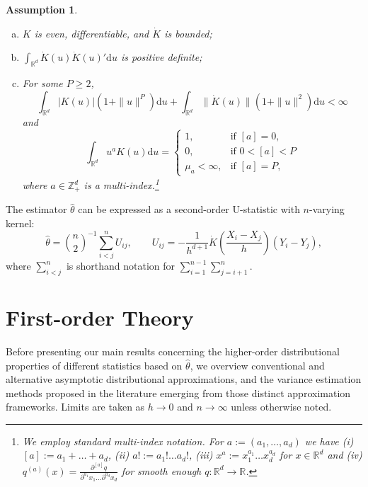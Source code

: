 \documentclass[11pt]{article}
\newtheorem{assumption}{Assumption}
\numberwithin{equation}{section}
\theoremstyle{definition}
\newcommand{\R}{\mathbb{R}}
\newcommand{\Z}{\mathbb{Z}}
\begin{document}
\begin{assumption}\label{A:kernel} $ $
\begin{enumerate}[(a)]
    \item $K$ is even, differentiable, and $\dot{K}$ is bounded;
    \item $\int_{\R^d} \dot{K}(u)\dot{K}(u)' \mathrm{d}u $ is positive definite;
    \item For some $P\geq 2$, 
    \[\int_{\R^d} |K(u)|(1+\|u\|^P) \mathrm{d}u + \int_{\R^d} \|\dot{K}(u)\|(1+\|u\|^2) \mathrm{d}u<\infty\]    
    and
    \[\int_{\R^d} u^a K(u) \mathrm{d}u =\begin{cases} 1, &\text{if } [a] =  0,\\
    0, &\text{if } 0<[a] <P\\
    \mu_a < \infty, &\text{if } [a] =P,
    \end{cases}\]
    where $a\in\Z^d_+$ is a multi-index.\footnote{We employ standard multi-index notation. For $a := (a_1,\dots,a_d)$ we have (i) $[a] := a_1+\dots +a_d$, (ii) $a! := a_1!\dots a_d!$, (iii) $x^a := x_1^{a_1}\dots x_d^{a_d}$ for $x\in\R^d$ and (iv) $q^{(a)}(x)= \frac{\partial^{[a]}q}{\partial^{a_1} x_1\dots \partial^{a_d} x_d}$ for smooth enough $q:\R^d\to\R$.}
\end{enumerate}
\end{assumption}

The estimator $\widehat{\theta}$ can be expressed as a second-order U-statistic with $n$-varying kernel:
\begin{equation}\label{eq:estimator}
    \widehat{\theta} = \binom{n}{2}^{-1}\sum_{i<j}^n U_{ij}, \qquad U_{ij} = -\frac{1}{h^{d+1}}\dot{K}\left(\frac{X_i-X_j}{h}\right)(Y_i-Y_j),
\end{equation}
where $\sum_{i<j}^n$ is shorthand notation for $\sum_{i=1}^{n-1}\sum_{j=i+1}^{n}$.

\section{First-order Theory}\label{sec: First-order Distribution Theory}

Before presenting our main results concerning the higher-order distributional properties of different statistics based on $\widehat{\theta}$, we overview conventional and alternative asymptotic distributional approximations, and the variance estimation methods proposed in the literature emerging from those distinct approximation frameworks. Limits are taken as $h\to0$ and $n\to\infty$ unless otherwise noted.
\end{document}
